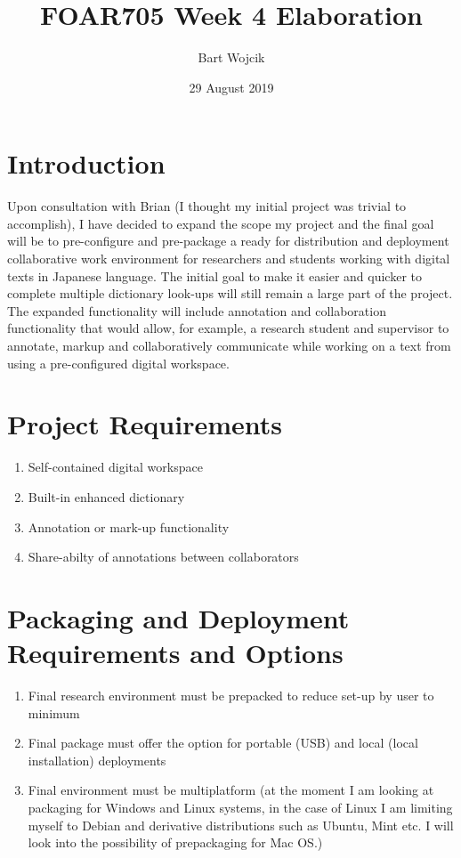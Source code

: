 \documentclass{article}
\title{FOAR705 Week 4 Elaboration}
\author{Bart Wojcik}
\date{29 August 2019}
\begin{document}
\maketitle

\section{Introduction}
Upon consultation with Brian (I thought my initial project was trivial to accomplish), I have decided to expand the scope my project and the final goal will be to pre-configure and pre-package a ready for distribution and deployment collaborative work environment for researchers and students working with digital texts in Japanese language. The initial goal to make it easier and quicker to complete multiple dictionary look-ups will still remain a large part of the project. The expanded functionality will include annotation and collaboration functionality that would allow, for example, a research student and supervisor to annotate, markup and collaboratively communicate while working on a text from using a pre-configured digital workspace.

\section{Project Requirements}
\begin{enumerate}
    \item Self-contained digital workspace
    \item Built-in enhanced dictionary
    \item Annotation or mark-up functionality
    \item Share-abilty of annotations between collaborators
\end{enumerate}
\section{Packaging and Deployment Requirements and Options}
\begin{enumerate}
    \item Final research environment must be prepacked to reduce set-up by user to minimum
    \item Final package must offer the option for portable (USB) and local (local installation) deployments
    \item Final environment must be multiplatform (at the moment I am looking at packaging for Windows and Linux systems, in the case of Linux I am limiting myself to Debian and derivative distributions such as Ubuntu, Mint etc. I will look into the possibility of prepackaging for Mac OS.)
\end{enumerate}
\end{document}
